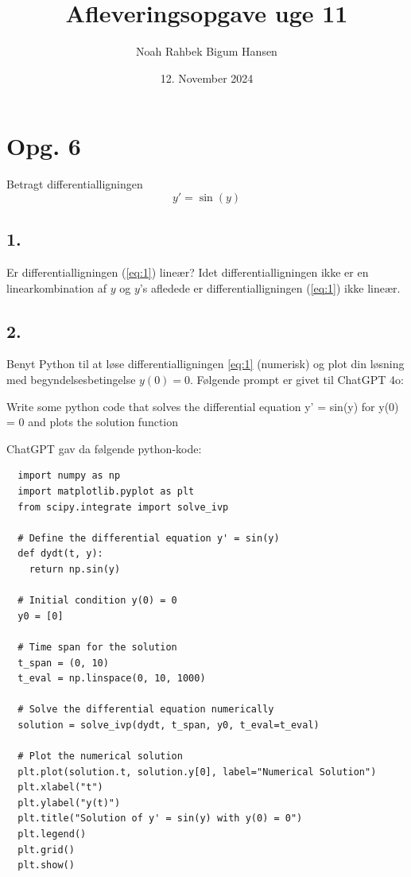 \documentclass[12pt]{article}
\title{Afleveringsopgave uge 11}
\author{Noah Rahbek Bigum Hansen}
\date{12. November 2024}
\theoremstyle{definition}
\begin{document}
\maketitle

\section*{Opg. 6}
Betragt differentialligningen
\begin{equation} \label{eq:1}
  y' = \sin(y)
\end{equation}

\subsection*{1.}
Er differentialligningen (\ref{eq:1}) lineær?
\bigbreak
Idet differentialligningen ikke er en linearkombination af $y$ og $y$'s afledede er differentialligningen (\ref{eq:1}) ikke lineær.

\subsection*{2.}
Benyt Python til at løse differentialligningen \ref{eq:1} (numerisk) og plot din løsning med begyndelsesbetingelse $y(0) = 0$.
\bigbreak
Følgende prompt er givet til ChatGPT 4o: 

\begin{blueline}
  Write some python code that solves the differential equation y' = sin(y) for y(0) = 0 and plots the solution function
\end{blueline}

ChatGPT gav da følgende python-kode:
\begin{verbatim}
  import numpy as np
  import matplotlib.pyplot as plt
  from scipy.integrate import solve_ivp

  # Define the differential equation y' = sin(y)
  def dydt(t, y):
    return np.sin(y)

  # Initial condition y(0) = 0
  y0 = [0]

  # Time span for the solution
  t_span = (0, 10)
  t_eval = np.linspace(0, 10, 1000)

  # Solve the differential equation numerically
  solution = solve_ivp(dydt, t_span, y0, t_eval=t_eval)

  # Plot the numerical solution
  plt.plot(solution.t, solution.y[0], label="Numerical Solution")
  plt.xlabel("t")
  plt.ylabel("y(t)")
  plt.title("Solution of y' = sin(y) with y(0) = 0")
  plt.legend()
  plt.grid()
  plt.show()
\end{verbatim}
\end{document}
